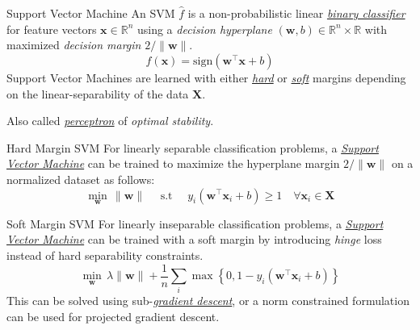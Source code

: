 \documentclass{cognito}
\begin{document}
\begin{note}{Support Vector Machine}
	An SVM $\hat f$ %
	is a non-probabilistic linear \hyperref[note:Supervised Learning]{\it binary classifier}
	for feature vectors $\bm x \in \mathbb{R}^n$ using a \emph{decision hyperplane} $(\bm w, b) \in \mathbb{R}^n \times \mathbb{R}$
	with maximized \emph{decision margin} $2/\| \bm w\|$.
	$$ \hat f(\bm x) = \text{sign}(\bm w^\intercal \bm x + b) $$
	Support Vector Machines are learned with either \hyperref[note:Hard Margin SVM]{\it hard} or \hyperref[note:Soft Margin SVM]{\it soft} margins
	depending on the linear-separability of the data $\bm X$.
	
	\begin{remark}
		Also called \hyperref[note:Perceptron]{\it perceptron} of \emph{optimal stability}.
	\end{remark}
	\vspace{-5pt}
\end{note}

\begin{note}{Hard Margin SVM}
	For linearly separable classification problems, a \hyperref[note:Support Vector Machine]{\it Support Vector Machine} can be trained
	to maximize the hyperplane margin $2/\| \bm w\|$ on a normalized dataset as follows:
	$$
		\min_{\bm w} \, \| \bm w \| \quad \text{ s.t } \quad y_i \left(\bm w^\intercal \bm x_i + b\right) \geq 1 \quad \forall \bm x_i \in \bm X
	$$
	\vspace{-10pt}
\end{note}

\begin{note}{Soft Margin SVM}
	For linearly inseparable classification problems, a \hyperref[note:Support Vector Machine]{\it Support Vector Machine} can be trained
	with a soft margin by introducing \emph{hinge} loss instead of hard separability constraints.
	$$
		\min_{\bm w} \, \lambda \| \bm w \|  +  \frac{1}{n} \sum_{i} \max \left\{0, 1 - y_i \left(\bm w^\intercal \bm x_i + b\right)\right\} 
	$$
	This can be solved using sub-\hyperref[note:Gradient Descent]{\it gradient descent}, or 
	a norm constrained formulation can be used for projected gradient descent.
	
\end{note}
\end{document}
